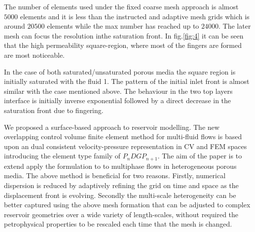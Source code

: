 \documentclass[preprint,authoryear,12pt]{elsarticle}
\begin{document}
The number of elements used under the fixed coarse mesh approach is almost $5000$ elements and it is less than the instructed and adaptive mesh  grids which is around $20500$ elements while the max number has reached up to $24000$. The later mesh can focus the resolution inthe saturation front. In fig.\ref{fig:4} it can be seen that the high permeability square-region, where most of the fingers are formed are most noticeable.

In the case of both saturated/unsaturated porous media the square region is initially saturated with the fluid 1. The pattern of the initial inlet front is almost similar with the case mentioned above. The behaviour in the two top layers interface is initially inverse exponential followed by a direct decrease in the saturation front due to fingering. 

We proposed a surface-based approach to reservoir modelling. The new overlapping control volume finite element method for multi-fluid flows is based upon an dual consistent velocity-pressure representation in CV and FEM spaces introducing the element type family of $P_n DG P_{n+1}$.  
The aim of the paper is to extend apply the formulation to to multiphase flows in heterogeneous porous media. The above method is beneficial for two reasons. Firstly, numerical dispersion is reduced by adaptively refining the grid on time and space as the displacement front is evolving. Secondly the multi-scale heterogeneity can be better captured using the above mesh formation that can be adjusted to complex reservoir geometries over a wide variety of length-scales, without required the petrophysical properties to be rescaled each time that the mesh is changed.\\
\end{document}
